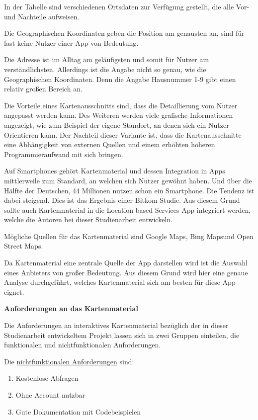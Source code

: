In der Tabelle sind verschiedenen Ortsdaten zur Verfügung gestellt, die alle Vor- und Nachteile aufweisen.

Die Geographischen Koordinaten geben die Position am genausten an, sind für fast keine Nutzer einer App von Bedeutung. 

Die Adresse ist im Alltag am geläufigsten und somit für Nutzer am verständlichsten. Allerdings ist die Angabe nicht so genau, wie die Geographischen Koordinaten. Denn die Angabe Hausnummer 1-9 gibt einen relativ großen Bereich an.

Die Vorteile eines Kartenausschnitts sind, dass die Detaillierung vom Nutzer angepasst werden kann. Des Weiteren werden viele grafische Informationen angezeigt, wie zum Beispiel der eigene Standort, an denen sich ein Nutzer Orientieren kann. Der Nachteil dieser Variante ist, dass die Kartenausschnitte eine Abhängigkeit von externen Quellen und einem erhöhten höheren Programmieraufwand mit sich bringen.


Auf Smartphones gehört Kartenmaterial und dessen Integration in Apps mittlerweile zum Standard, an welchen sich Nutzer gewöhnt haben. Und über die Hälfte der Deutschen, 44 Millionen nutzen schon ein Smartphone. Die Tendenz ist dabei steigend. Dies ist das Ergebnis einer Bitkom Studie. \cite{bitkom} Aus diesem Grund sollte auch Kartenmaterial in die Location based Services App integriert werden, welche die Autoren bei dieser Studienarbeit entwickeln. 

Mögliche Quellen für das Kartenmaterial sind \glqq Google Maps\grqq, \glqq Bing Maps\grqq  und \glqq Open Street Maps\grqq.

Da Kartenmaterial eine zentrale Quelle der App darstellen wird ist die Auswahl eines Anbieters von großer Bedeutung. Aus diesem Grund wird hier eine genaue Analyse durchgeführt, welches Kartenmaterial sich am besten für diese App eignet.

\textbf{Anforderungen an das Kartenmaterial}

Die Anforderungen an interaktives Kartenmaterial bezüglich der in dieser Studienarbeit entwickeltem Projekt lassen sich in zwei Gruppen einteilen, die funktionalen und nichtfunktionalen Anforderungen.

Die \underline{nichtfunktionalen Anforderungen} sind:
\begin{enumerate}
\item Kostenlose Abfragen
\item Ohne Account nutzbar
\item Gute Dokumentation mit Codebeispielen
\end{enumerate}

